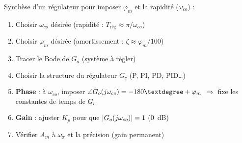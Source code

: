 \begin{tcolorbox}[colback=ch5red!5,colframe=ch5red!80!black,title={M\'ethode de Bode : marche \`a suivre}]
Synth\`ese d'un r\'egulateur pour imposer $\varphi_m$ et la rapidit\'e ($\omega_{co}$) :
\begin{enumerate}
  \item Choisir $\omega_{co}$ d\'esir\'ee (rapidit\'e : $T_{\text{r\'eg}}\approx\pi/\omega_{co}$)
  \item Choisir $\varphi_m$ d\'esir\'ee (amortissement : $\zeta\approx\varphi_m/100$)
  \item Tracer le Bode de $G_a$ (syst\`eme \`a r\'egler)
  \item Choisir la structure du r\'egulateur $G_c$ (P, PI, PD, PID\dots)
  \item \textbf{Phase} : \`a $\omega_{co}$, imposer $\angle G_o(\jw_{co}) = -180° + \varphi_m$ $\Rightarrow$ fixe les constantes de temps de $G_c$
  \item \textbf{Gain} : ajuster $K_p$ pour que $|G_o(j\omega_{co})| = 1$ (0~dB)
  \item V\'erifier $A_m$ \`a $\omega_\pi$ et la pr\'ecision (gain permanent)
\end{enumerate}
\end{tcolorbox}
